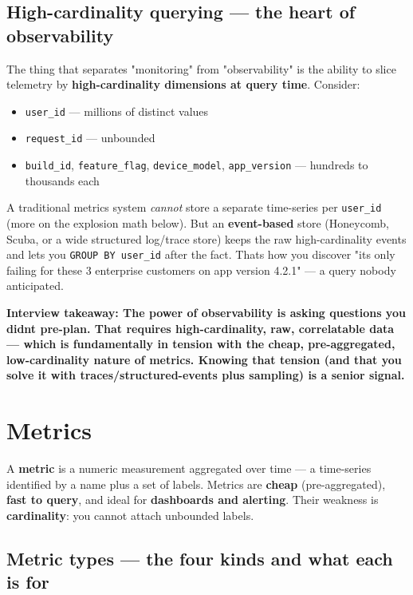 \documentclass[11pt]{article}
\providecommand{\tightlist}{\setlength{\itemsep}{1pt}\setlength{\parskip}{0pt}}
\begin{document}
\subsection{High-cardinality querying --- the heart of observability}\label{high-cardinality-querying--the-heart-of-observability}

The thing that separates "monitoring" from "observability" is the ability to slice telemetry by \textbf{high-cardinality dimensions at query time}. Consider:

\begin{itemize}
\tightlist
\item
  \texttt{user\_id} --- millions of distinct values
\item
  \texttt{request\_id} --- unbounded
\item
  \texttt{build\_id}, \texttt{feature\_flag}, \texttt{device\_model}, \texttt{app\_version} --- hundreds to thousands each
\end{itemize}

A traditional metrics system \emph{cannot} store a separate time-series per \texttt{user\_id} (more on the explosion math below). But an \textbf{event-based} store (Honeycomb, Scuba, or a wide structured log/trace store) keeps the raw high-cardinality events and lets you \texttt{GROUP\ BY\ user\_id} after the fact. That\textquotesingle s how you discover "it\textquotesingle s only failing for these 3 enterprise customers on app version 4.2.1" --- a query nobody anticipated.

\textbf{Interview takeaway: The power of observability is asking questions you didn\textquotesingle t pre-plan. That requires high-cardinality, raw, correlatable data --- which is fundamentally in tension with the cheap, pre-aggregated, low-cardinality nature of metrics. Knowing that tension (and that you solve it with traces/structured-events plus sampling) is a senior signal.}

\section{Metrics}\label{metrics}

A \textbf{metric} is a numeric measurement aggregated over time --- a time-series identified by a name plus a set of labels. Metrics are \textbf{cheap} (pre-aggregated), \textbf{fast to query}, and ideal for \textbf{dashboards and alerting}. Their weakness is \textbf{cardinality}: you cannot attach unbounded labels.

\subsection{Metric types --- the four kinds and what each is for}\label{metric-types--the-four-kinds-and-what-each-is-for}
\end{document}
